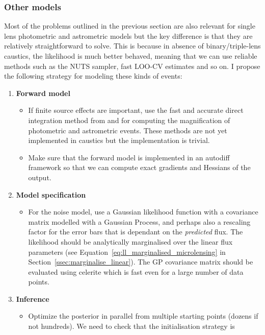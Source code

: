 \documentclass[12pt,dvipsnames]{report}
\newcommand{\ssf}[1]{\textsf{#1}}
\begin{document}
\subsubsection{Other models}
Most of the problems outlined in the previous section are also relevant for single lens 
photometric and astrometric models but the key difference is that they are relatively 
straightforward to solve. This is because in absence of binary/triple-lens caustics, 
the likelihood is much better behaved, meaning that we can use reliable methods such 
as the NUTS sampler, fast LOO-CV estimates and so on. I propose the following strategy 
for modeling these kinds of events:
\begin{enumerate}
    \item \textbf{Forward model} 
    \begin{itemize}
    \item If finite source effects are important, 
   use the fast and accurate direct integration method from 
    \citet{2009ApJ...695..200L} and \citet{https://arxiv.org/abs/1005.3021} for computing
    the magnification of photometric and astrometric events. These methods are not yet implemented in \ssf{caustics} but the 
    implementation is trivial. 
    \item  Make sure that the forward model is implemented in an autodiff framework so that we 
    can compute exact gradients and Hessians of the output.
    \end{itemize}
    \item \textbf{Model specification} 
    \begin{itemize}
    \item For the noise model, use a Gaussian likelihood 
    function with a covariance matrix modelled with a Gaussian Process, and perhaps also a rescaling 
    factor for the error bars that is dependant on the \emph{predicted} flux. The likelihood should be 
    analytically marginalised over the linear flux parameters (see
    Equation~\ref{eq:ll_marginalised_microlensing} in Section~\ref{ssec:marginalise_linear}).
    The GP covariance matrix should be evaluated using \ssf{celerite} 
    \citep{2017AJ....154..220F} which is fast even for a large number of data points.
    \end{itemize}
    \item \textbf{Inference} 
    \begin{itemize}
    \item Optimize the posterior in parallel from multiple starting points 
    (dozens if not hundreds). We need to check that the initialisation strategy is 

\end{itemize}
\end{enumerate}
\end{document}
